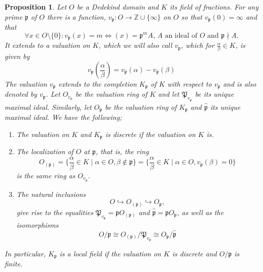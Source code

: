 \documentclass{article}
\newtheorem{proposition}{Proposition}[section]
\newcommand{\mfrak}[1]{\mathfrak{#1}}
\newcommand{\mbb}[1]{\mathbb{#1}}
\newcommand{\vp}{{v_{\mfrak p}}}
\begin{document}
\begin{proposition}
    Let $O$ be a Dedekind domain and $K$ its field of fractions. For any prime $\mfrak p$ of $O$ there is a function, $\vp : O \to \mbb Z \cup \{\infty \}$ on $O$ so that $\vp(0) = \infty$ and that
    \begin{equation}\label{eq: valuation}
        \forall x \in O\setminus \{0 \}: \vp(x) = m \iff (x) = \mfrak p^m A \text{, $A$ an ideal of $O$ and $\mfrak p \nmid A$}. 
    \end{equation}
    It extends to a valuation on $K$, which we will also call $\vp$, which for $\frac{\alpha}{\beta} \in K$, is given by %
    $$v_\mfrak{p}(\frac{\alpha}{\beta}) = v_\mfrak{p}(\alpha) - v_\mfrak{p}(\beta)$$
    The valuation $v_\mfrak{p}$ extends to the completion $K_\mfrak{p}$ of $K$ with respect to $v_\mfrak{p}$ and is also denoted by $v_\mfrak{p}$. Let $O_{v_p}$ be the valuation ring of $K$ and let $\mfrak{P}_{v_\mfrak{p}}$ be its unique maximal ideal. Similarly, let $O_\mfrak{p}$ be the valuation ring of $K_\mfrak{p}$ and $\hat{\mfrak{p}}$ its unique maximal ideal. We have the following;
    
    \begin{enumerate}
        \item The valuation on $K$ and $K_\mfrak p$ is discrete if the valuation on $K$ is.
        \item The localization of $O$ at $\mfrak p$, that is, the ring 
        $$O_{(\mfrak p)} = \{\frac{\alpha}{\beta} \in K \mid \alpha \in O, \beta \notin \mfrak p\} =  \{\frac{\alpha}{\beta} \in K \mid \alpha \in O, \vp(\beta) = 0 \}$$
        is the same ring as $O_{\vp}$.
        \item The natural inclusions
        $$O \hookrightarrow O_{(\mfrak p)} \hookrightarrow O_\mfrak p,$$
        give rise to the equalities $\mfrak P_\vp = \mfrak p O_{(\mfrak p)}$ and $\hat {\mfrak p }= \mfrak p O_{\mfrak p}$, as well as the isomorphisms
        $$
        O / \mfrak{p} \cong O_{(\mfrak{p})} / \mfrak{P}_{v_{\mfrak{p}}} \cong O_{\mfrak{p}} / \hat{\mfrak{p}}
        $$

    \end{enumerate}
    In particular, $K_\mfrak p$ is a local field if the valuation on $K$ is discrete and $O / \mfrak{p}$ is finite.
      
    
    
    
\end{proposition}
\end{document}
